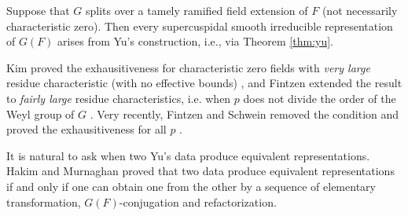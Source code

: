 \begin{theorem}
\label{thm:exhaustive}
Suppose that $G$ splits over a tamely ramified field extension of $F$ (not necessarily characteristic zero).
Then every supercuspidal smooth irreducible representation of $G(F)$ arises from Yu's construction, i.e., via Theorem \ref{thm:yu}.
\end{theorem}

Kim proved the exhausitiveness for characteristic zero fields with \emph{very large} residue characteristic (with no effective bounds) \cite{kim2007supercuspidal}, and Fintzen extended the result to \emph{fairly large} residue characteristics, i.e. when $p$ does not divide the order of the Weyl group of $G$ \cite{fintzen2021types}.
Very recently, Fintzen and Schwein removed the condition and proved the exhausitiveness for all $p$ \cite{fintzen2025construction}.

It is natural to ask when two Yu's data produce equivalent representations.
Hakim and Murnaghan \cite{hakim2008distinguished} proved that two data produce equivalent representations if and only if one can obtain one from the other by a sequence of elementary transformation, $G(F)$-conjugation and refactorization.